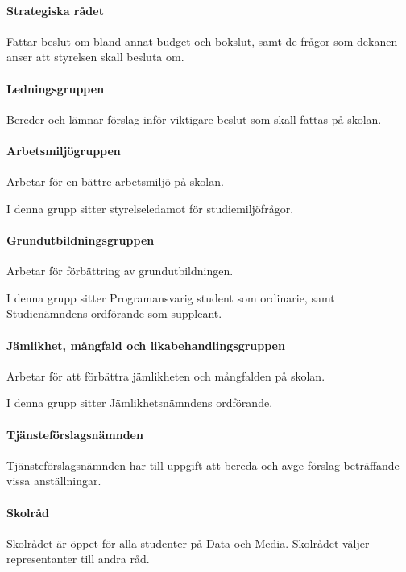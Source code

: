 \documentclass{dgovdoc}
\begin{document}
\paragraph{Strategiska rådet}

Fattar beslut om bland annat budget och bokslut, samt de frågor som dekanen
anser att styrelsen skall besluta om.

\paragraph{Ledningsgruppen}

Bereder och lämnar förslag inför viktigare beslut som skall fattas på skolan.

\paragraph{Arbetsmiljögruppen}

Arbetar för en bättre arbetsmiljö på skolan.

I denna grupp sitter styrelseledamot för studiemiljöfrågor.

\paragraph{Grundutbildningsgruppen}

Arbetar för förbättring av grundutbildningen.

I denna grupp sitter Programansvarig student som ordinarie, samt Studienämndens
ordförande som suppleant.

\paragraph{Jämlikhet, mångfald och likabehandlingsgruppen}

Arbetar för att förbättra jämlikheten och mångfalden på skolan.

I denna grupp sitter Jämlikhetsnämndens ordförande.

\paragraph{Tjänsteförslagsnämnden}

Tjänsteförslagsnämnden har till uppgift att bereda och avge förslag beträffande
vissa anställningar.

\paragraph{Skolråd}
Skolrådet är öppet för alla studenter på Data och Media. Skolrådet väljer representanter till andra råd.
\end{document}
